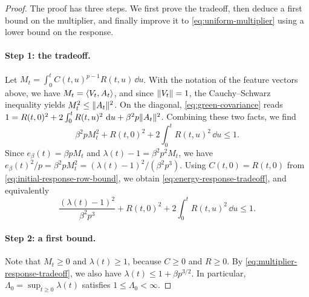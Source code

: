 \begin{proof}
The proof has three steps. We first prove the tradeoff, then deduce a first bound on the multiplier, and finally improve it to \eqref{eq:uniform-multiplier} using a lower bound on the response.

\paragraph{Step 1: the tradeoff.}
Let $M_t=\int_0^tC(t,u)^{p-1}R(t,u)\,\dd u$. With the notation of the feature vectors above, we have $M_t=\left\langle V_t,A_t\right\rangle$, and since $\lVert V_t\rVert=1$, the Cauchy--Schwarz inequality yields $M_t^2\le\lVert A_t\rVert^2$. On the diagonal, \eqref{eq:green-covariance} reads $1=R(t,0)^2+2\int_0^tR(t,u)^2\,\mathop{}\!\mathrm d u+\beta^2p\lVert A_t\rVert^2$. Combining these two facts, we find
\[
 \beta^2pM_t^2+R(t,0)^2+2\int_0^tR(t,u)^2\,\dd u\le1.
\]
Since $e_\beta(t)=\beta pM_t$ and $\lambda(t)-1=\beta^2p^2M_t$, we have $e_\beta(t)^2/p=\beta^2pM_t^2=(\lambda(t)-1)^2/(\beta^2p^3)$. Using $C(t,0)=R(t,0)$ from \eqref{eq:initial-response-row-bound}, we obtain \eqref{eq:energy-response-tradeoff}, and equivalently
\begin{equation}
\frac{(\lambda(t)-1)^2}{\beta^2p^3}
 +R(t,0)^2+2\int_0^tR(t,u)^2\,\dd u\le1.
\label{eq:multiplier-response-tradeoff}
\end{equation}

\paragraph{Step 2: a first bound.}
Note that $M_t\ge0$ and $\lambda(t)\ge1$, because $C\ge0$ and $R\ge0$. By \eqref{eq:multiplier-response-tradeoff}, we also have $\lambda(t)\le1+\beta p^{3/2}$. In particular, $\Lambda_0=\sup_{t\ge0}\lambda(t)$ satisfies $1\le\Lambda_0<\infty$.


\end{proof}
